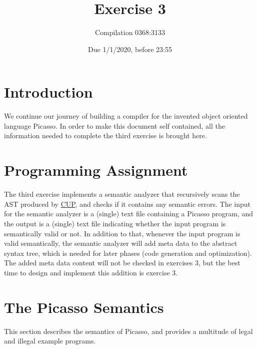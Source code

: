 \documentclass{article}
\begin{document}
\title{Exercise 3}

\author{Compilation 0368:3133}

\date{Due 1/1/2020, before 23:55}

\maketitle

\section{Introduction}
We continue our journey of building a compiler
for the invented object oriented language Picasso.
In order to make this document self contained,
all the information needed to complete the third exercise is brought here.

\section{Programming Assignment}
The third exercise implements a semantic analyzer that
recursively scans the AST produced by
\href{http://www2.cs.tum.edu/projects/cup/}{CUP},
and checks if it contains any semantic errors.
The input for the semantic analyzer is a (single) text file containing a Picasso program,
and the output is a (single) text file indicating whether the input program
is semantically valid or not.
In addition to that, whenever the input program is valid semantically,
the semantic analyzer will add meta data to the abstract syntax tree,
which is needed for later phases (code generation and optimization).
The added meta data content will not be checked in exercises $3$,
but the best time to design and implement this addition is
exercise $3$.

\section{The Picasso Semantics}
This section describes the semantics of Picasso,
and provides a multitude of legal and illegal example programs.
\end{document}
